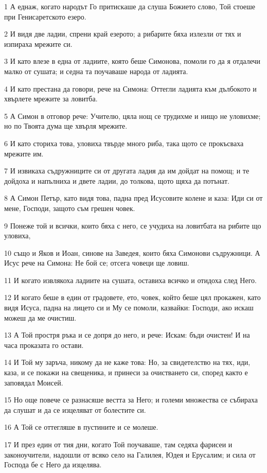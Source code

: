 \par 1 А еднаж, когато народът Го притискаше да слуша Божието слово, Той стоеше при Генисаретското езеро.
\par 2 И видя две ладии, спрени край езерото; а рибарите бяха излезли от тях и изпираха мрежите си.
\par 3 И като влезе в една от ладиите, която беше Симонова, помоли го да я отдалечи малко от сушата; и седна та поучаваше народа от ладията.
\par 4 И като престана да говори, рече на Симона: Оттегли ладията към дълбокото и хвърлете мрежите за ловитба.
\par 5 А Симон в отговор рече: Учителю, цяла нощ се трудихме и нищо не уловихме; но по Твоята дума ще хвърля мрежите.
\par 6 И като сториха това, уловиха твърде много риба, така щото се прокъсваха мрежите им.
\par 7 И извикаха съдружниците си от другата ладия да им дойдат на помощ; и те дойдоха и напълниха и двете ладии, до толкова, щото щяха да потънат.
\par 8 А Симон Петър, като видя това, падна пред Исусовите колене и каза: Иди си от мене, Господи, защото съм грешен човек.
\par 9 Понеже той и всички, които бяха с него, се учудиха на ловитбата на рибите що уловиха,
\par 10 също и Яков и Иоан, синове на Заведея, които бяха Симонови съдружници. А Исус рече на Симона: Не бой се; отсега човеци ще ловиш.
\par 11 И когато извлякоха ладиите на сушата, оставиха всичко и отидоха след Него.
\par 12 И когато беше в един от градовете, ето, човек, който беше цял прокажен, като видя Исуса, падна на лицето си и Му се помоли, казвайки: Господи, ако искаш можеш да ме очистиш.
\par 13 А Той простря ръка и се допря до него, и рече: Искам: бъди очистен! И на часа проказата го остави.
\par 14 И Той му заръча, никому да не каже това: Но, за свидетелство на тях, иди, каза, и се покажи на свещеника, и принеси за очистването си, според както е заповядал Моисей.
\par 15 Но още повече се разнасяше вестта за Него; и големи множества се събираха да слушат и да се изцеляват от болестите си.
\par 16 А Той се оттегляше в пустините и се молеше.
\par 17 И през един от тия дни, когато Той поучаваше, там седяха фарисеи и законоучители, надошли от всяко село на Галилея, Юдея и Ерусалим; и сила от Господа бе с Него да изцелява.
